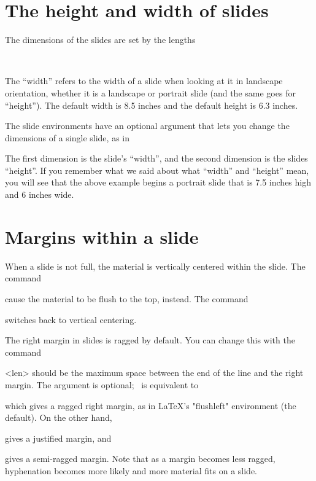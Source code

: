 \section{The height and width of slides\label{slidedim}}

The dimensions of the slides are set by the lengths
\begin{MD}
  \slidewidth\\
  \slideheight
\end{MD}
The ``width'' refers to the width of a slide when looking at it in landscape
orientation, whether it is a landscape or portrait slide (and the same goes
for ``height''). The default width is 8.5 inches and the default height is 6.3
inches.

The slide environments have an optional argument that lets you change the
dimensions of a single slide, as in
\begin{LVerbatim}
  \begin{slide*}[7.5in,6in]
\end{LVerbatim}
The first dimension is the slide's ``width'', and the second dimension is the
slides ``height''. If you remember what we said about what ``width'' and
``height'' mean, you will see that the above example begins a portrait slide
that is 7.5 inches high and 6 inches wide.


\section{Margins within a slide}

When a slide is not full, the material is vertically centered within the
slide. The command
\begin{MD}
  \centerslidesfalse
\end{MD}
cause the material to be flush to the top, instead. The command
\begin{MD}
  \centerslidestrue
\end{MD}
switches back to vertical centering.

The right margin in slides is ragged by default. You can change this with the
command
\begin{MD}
  \raggedslides[len]
\end{MD}
<len> should be the maximum space between the end of the line and the right
margin. The argument is optional; \n\raggedslides\ is equivalent to
\begin{LVerbatim}
  \raggedslides[1fil]
\end{LVerbatim}
which gives a ragged right margin, as in \LaTeX's "flushleft" environment (the
default). On the other hand,
\begin{LVerbatim}
  \raggedslides[0pt]
\end{LVerbatim}
gives a justified margin, and
\begin{LVerbatim}
  \raggedslides[2em]
\end{LVerbatim}
gives a semi-ragged margin. Note that as a margin becomes less ragged,
hyphenation becomes more likely and more material fits on a slide.

